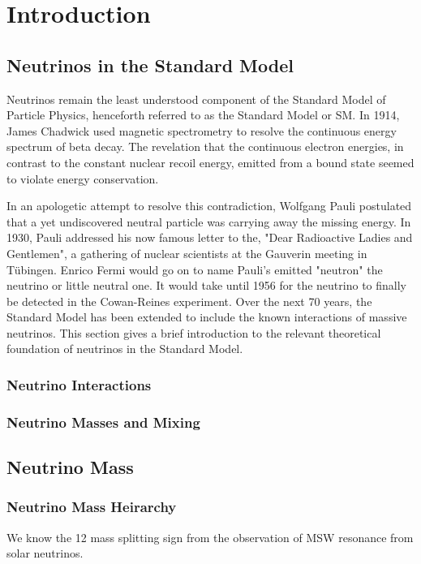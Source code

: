 \chapter{Introduction}
\label{chapter:introduction}
\thispagestyle{myheadings}

\graphicspath{{1_Chapter_Intro/Figures/}}

\section{Neutrinos in the Standard Model}
Neutrinos remain the least understood component of the Standard Model of Particle Physics, henceforth referred to as the Standard Model or SM. In 1914, James Chadwick used magnetic spectrometry to resolve the continuous energy spectrum of beta decay. The revelation that the continuous electron energies, in contrast to the constant nuclear recoil energy, emitted from a bound state seemed to violate energy conservation.

In an apologetic attempt to resolve this contradiction, Wolfgang Pauli postulated that a yet undiscovered neutral particle was carrying away the missing energy. In 1930, Pauli addressed his now famous letter to the, "Dear Radioactive Ladies and Gentlemen"\cite{Pauli:1930pc}, a gathering of nuclear scientists at the Gauverin meeting in Tübingen. Enrico Fermi would go on to name Pauli's emitted "neutron" the neutrino or little neutral one. It would take until 1956 for the neutrino to finally be detected in the Cowan-Reines experiment\cite{cowan1956}. Over the next 70 years, the Standard Model has been extended to include the known interactions of massive neutrinos. This section gives a brief introduction to the relevant theoretical foundation of neutrinos in the Standard Model.
\subsection{Neutrino Interactions}
\subsection{Neutrino Masses and Mixing}
\section{Neutrino Mass}
\subsection{Neutrino Mass Heirarchy}
We know the 12 mass splitting sign from the observation of MSW resonance from solar neutrinos.\cite{kamei_phd}
